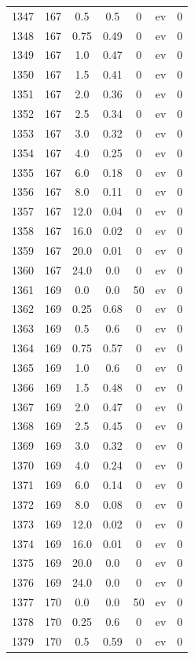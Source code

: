 \documentclass[12pt,a4paper]{article}
\begin{document}
\begin{tabular}{r|cccccc}
	1347 & 167 & 0.5 & 0.5 & 0 & ev & 0 \\
	1348 & 167 & 0.75 & 0.49 & 0 & ev & 0 \\
	1349 & 167 & 1.0 & 0.47 & 0 & ev & 0 \\
	1350 & 167 & 1.5 & 0.41 & 0 & ev & 0 \\
	1351 & 167 & 2.0 & 0.36 & 0 & ev & 0 \\
	1352 & 167 & 2.5 & 0.34 & 0 & ev & 0 \\
	1353 & 167 & 3.0 & 0.32 & 0 & ev & 0 \\
	1354 & 167 & 4.0 & 0.25 & 0 & ev & 0 \\
	1355 & 167 & 6.0 & 0.18 & 0 & ev & 0 \\
	1356 & 167 & 8.0 & 0.11 & 0 & ev & 0 \\
	1357 & 167 & 12.0 & 0.04 & 0 & ev & 0 \\
	1358 & 167 & 16.0 & 0.02 & 0 & ev & 0 \\
	1359 & 167 & 20.0 & 0.01 & 0 & ev & 0 \\
	1360 & 167 & 24.0 & 0.0 & 0 & ev & 0 \\
	1361 & 169 & 0.0 & 0.0 & 50 & ev & 0 \\
	1362 & 169 & 0.25 & 0.68 & 0 & ev & 0 \\
	1363 & 169 & 0.5 & 0.6 & 0 & ev & 0 \\
	1364 & 169 & 0.75 & 0.57 & 0 & ev & 0 \\
	1365 & 169 & 1.0 & 0.6 & 0 & ev & 0 \\
	1366 & 169 & 1.5 & 0.48 & 0 & ev & 0 \\
	1367 & 169 & 2.0 & 0.47 & 0 & ev & 0 \\
	1368 & 169 & 2.5 & 0.45 & 0 & ev & 0 \\
	1369 & 169 & 3.0 & 0.32 & 0 & ev & 0 \\
	1370 & 169 & 4.0 & 0.24 & 0 & ev & 0 \\
	1371 & 169 & 6.0 & 0.14 & 0 & ev & 0 \\
	1372 & 169 & 8.0 & 0.08 & 0 & ev & 0 \\
	1373 & 169 & 12.0 & 0.02 & 0 & ev & 0 \\
	1374 & 169 & 16.0 & 0.01 & 0 & ev & 0 \\
	1375 & 169 & 20.0 & 0.0 & 0 & ev & 0 \\
	1376 & 169 & 24.0 & 0.0 & 0 & ev & 0 \\
	1377 & 170 & 0.0 & 0.0 & 50 & ev & 0 \\
	1378 & 170 & 0.25 & 0.6 & 0 & ev & 0 \\
	1379 & 170 & 0.5 & 0.59 & 0 & ev & 0 \\

\end{tabular}
\end{document}
